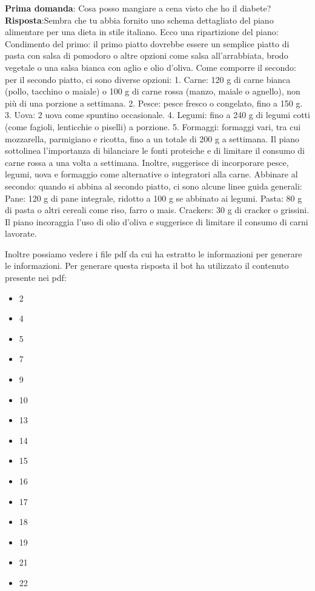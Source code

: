 \documentclass[a4paper,twoside,12pt]{toptesi}
\begin{document}
\textbf{Prima domanda}: Cosa posso mangiare a cena visto che ho il diabete? \\
\textbf{Risposta}:Sembra che tu abbia fornito uno schema dettagliato del piano alimentare per una dieta in stile italiano. Ecco una ripartizione del piano: Condimento del primo: il primo piatto dovrebbe essere un semplice piatto di pasta con salsa di pomodoro o altre opzioni come salsa all'arrabbiata, brodo vegetale o una salsa bianca con aglio e olio d'oliva. Come comporre il secondo: per il secondo piatto, ci sono diverse opzioni: 1. Carne: 120 g di carne bianca (pollo, tacchino o maiale) o 100 g di carne rossa (manzo, maiale o agnello), non più di una porzione a settimana. 2. Pesce: pesce fresco o congelato, fino a 150 g. 3. Uova: 2 uova come spuntino occasionale. 4. Legumi: fino a 240 g di legumi cotti (come fagioli, lenticchie o piselli) a porzione. 5. Formaggi: formaggi vari, tra cui mozzarella, parmigiano e ricotta, fino a un totale di 200 g a settimana. Il piano sottolinea l'importanza di bilanciare le fonti proteiche e di limitare il consumo di carne rossa a una volta a settimana. Inoltre, suggerisce di incorporare pesce, legumi, uova e formaggio come alternative o integratori alla carne. Abbinare al secondo: quando si abbina al secondo piatto, ci sono alcune linee guida generali: Pane: 120 g di pane integrale, ridotto a 100 g se abbinato ai legumi. Pasta: 80 g di pasta o altri cereali come riso, farro o mais. Crackers: 30 g di cracker o grissini. Il piano incoraggia l'uso di olio d'oliva e suggerisce di limitare il consumo di carni lavorate.

Inoltre possiamo vedere i file pdf da cui ha estratto le informazioni per generare le informazioni. Per generare questa risposta il bot ha utilizzato il contenuto presente nei pdf:
\begin{itemize}
\item 2
\item 4
\item 5
\item 7
\item 9
\item 10
\item 13
\item 14
\item 15
\item 16
\item 17
\item 18
\item 19
\item 21
\item 22
\end{itemize}
\end{document}
